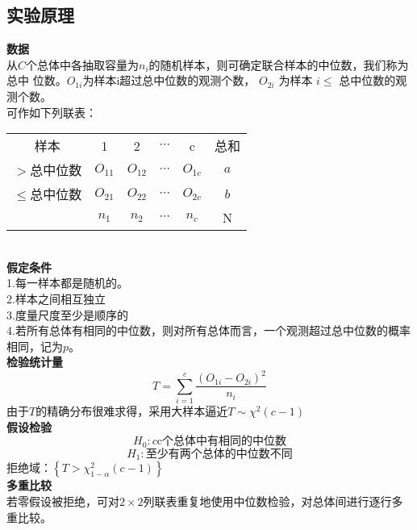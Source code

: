 \documentclass[a4paper, 11pt]{article}
\begin{document}
\subsection{实验原理}
\noindent \textbf{数据}\\
\indent 从$ C $个总体中各抽取容量为$ n_{i} $的随机样本，则可确定联合样本的中位数，我们称为总中
位数。$ O_{1i} $为样本i超过总中位数的观测个数， $O_{2i}$ 为样本 $i \leqslant$ 总中位数的观测个数。\\
可作如下列联表：\\
\begin{table}[!h]
	\centering
	\begin{tabular}{cccccc}
		
		样本&1&2& $ \cdots $ &c&总和\\
		\cline{2-5}
		\multicolumn{1}{c|}{$>$总中位数}&\multicolumn{1}{c|}{$ O_{11} $}&\multicolumn{1}{c|}{$ O_{12} $}&\multicolumn{1}{c|}{$\cdots $}&\multicolumn{1}{c|}{$ O_{1c} $}&$ a $\\
		\cline{2-5}
		\multicolumn{1}{c|}{$ \leqslant $总中位数}&\multicolumn{1}{c|}{$ O_{21} $}&\multicolumn{1}{c|}{$ O_{22} $}&\multicolumn{1}{c|}{$\cdots $}&\multicolumn{1}{c|}{$ O_{2c} $}&$ b $\\
		\cline{2-5}
		&$ n_{1} $&$ n_{2} $&$\cdots $&$ n_{c} $&N
	\end{tabular}
\end{table}\\
\textbf{假定条件}\\
\indent 1.每一样本都是随机的。\\
\indent 2.样本之间相互独立\\
\indent 3.度量尺度至少是顺序的\\
\indent 4.若所有总体有相同的中位数，则对所有总体而言，一个观测超过总中位数的概率相同，记为$ p $。\\
\textbf{检验统计量}\\
$$T=\sum_{i=1}^{c} \frac{\left(O_{1 i}-O_{2 i}\right)^{2}}{n_{i}}$$
由于$ T $的精确分布很难求得，采用大样本逼近$T\sim \chi^{2}(c-1)$\\
\textbf{假设检验}
$$H_{0}:c\text{c个总体中有相同的中位数}$$
$$H_{1}:\text{至少有两个总体的中位数不同}$$
拒绝域：$\left\{T>\chi_{1-\alpha}^{2}(c-1)\right\}$\\
\textbf{多重比较}\\
\indent 若零假设被拒绝，可对$ 2\times2 $列联表重复地使用中位数检验，对总体间进行逐行多重比较。
\end{document}
